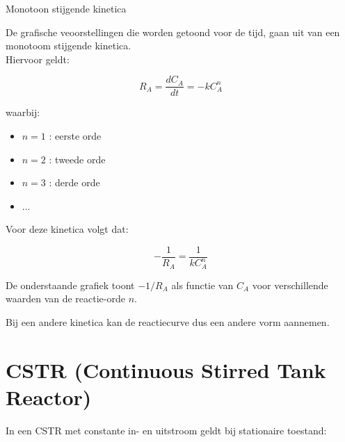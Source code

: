 \documentclass{ximera}
\begin{document}
\begin{remark}
Monotoon stijgende kinetica

De grafische veoorstellingen die worden getoond voor de tijd, gaan uit van een monotoom stijgende kinetica. \\
Hiervoor geldt: 

\[
R_A = \frac{dC_A}{dt} = -k C_A^n
\]

waarbij:

\begin{itemize}
\item $n=1$ : eerste orde
\item $n=2$ : tweede orde
\item $n=3$ : derde orde
\item $\dots$
\end{itemize}

Voor deze kinetica volgt dat:

\[
-\frac{1}{R_A} = \frac{1}{k C_A^n}
\]

De onderstaande grafiek toont $-1/R_A$ als functie van $C_A$
voor verschillende waarden van de reactie-orde $n$. 


Bij een andere kinetica kan de reactiecurve dus een andere vorm aannemen.
\end{remark}


\section{CSTR (Continuous Stirred Tank Reactor)}

In een CSTR met constante in- en uitstroom geldt bij stationaire toestand:
\end{document}
